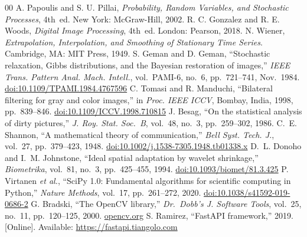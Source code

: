 \documentclass[10pt,conference]{IEEEtran}
\begin{document}
\begin{thebibliography}{00}
 A. Papoulis and S. U. Pillai, \textit{Probability, Random Variables, and Stochastic Processes}, 4th~ed. New York: McGraw-Hill, 2002.
 R. C. Gonzalez and R. E. Woods, \textit{Digital Image Processing}, 4th~ed. London: Pearson, 2018.
 N. Wiener, \textit{Extrapolation, Interpolation, and Smoothing of Stationary Time Series}. Cambridge, MA: MIT Press, 1949.
 S. Geman and D. Geman, ``Stochastic relaxation, Gibbs distributions, and the Bayesian restoration of images,'' \textit{IEEE Trans. Pattern Anal. Mach. Intell.}, vol.~PAMI-6, no.~6, pp.~721--741, Nov.~1984. \href{https://doi.org/10.1109/TPAMI.1984.4767596}{doi:10.1109/TPAMI.1984.4767596}
 C. Tomasi and R. Manduchi, ``Bilateral filtering for gray and color images,'' in \textit{Proc. IEEE ICCV}, Bombay, India, 1998, pp.~839--846. \href{https://doi.org/10.1109/ICCV.1998.710815}{doi:10.1109/ICCV.1998.710815}
 J. Besag, ``On the statistical analysis of dirty pictures,'' \textit{J. Roy. Stat. Soc.~B}, vol.~48, no.~3, pp.~259--302, 1986.
 C.~E. Shannon, ``A mathematical theory of communication,'' \textit{Bell Syst. Tech. J.}, vol.~27, pp.~379--423, 1948. \href{https://doi.org/10.1002/j.1538-7305.1948.tb01338.x}{doi:10.1002/j.1538-7305.1948.tb01338.x}
 D.~L. Donoho and I.~M. Johnstone, ``Ideal spatial adaptation by wavelet shrinkage,'' \textit{Biometrika}, vol.~81, no.~3, pp.~425--455, 1994. \href{https://doi.org/10.1093/biomet/81.3.425}{doi:10.1093/biomet/81.3.425}
 P. Virtanen \textit{et al.}, ``SciPy 1.0: Fundamental algorithms for scientific computing in Python,'' \textit{Nature Methods}, vol.~17, pp.~261--272, 2020. \href{https://doi.org/10.1038/s41592-019-0686-2}{doi:10.1038/s41592-019-0686-2}
 G. Bradski, ``The OpenCV library,'' \textit{Dr.~Dobb's J. Software Tools}, vol.~25, no.~11, pp.~120--125, 2000. \href{https://opencv.org}{opencv.org}
 S. Ramirez, ``FastAPI framework,'' 2019. [Online]. Available: \href{https://fastapi.tiangolo.com}{https://fastapi.tiangolo.com}
\end{thebibliography}
\end{document}

